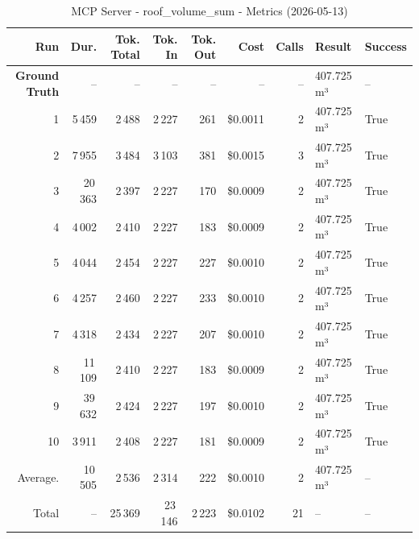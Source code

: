 \documentclass[a4paper,11pt]{article}
\begin{document}
\begin{table}[ht]
\centering
\scriptsize
\caption{MCP Server - roof\_volume\_sum - Metrics (2026-05-13)}
\label{tab:mcp\_roof\_volume\_sum\_metrics\_2026-05-13}
\begin{tabular}{r r r r r r r p{3cm} l}
\hline
Run & Dur. & Tok. Total & Tok. In & Tok. Out & Cost & Calls & Result & Success \\
\hline
\textbf{Ground Truth} & -- & -- & -- & -- & -- & -- & 407.725 m³ & -- \\
\hline
1 & 5\,459 & 2\,488 & 2\,227 & 261 & \$0.0011 & 2 & 407.725 m³ & True \\
2 & 7\,955 & 3\,484 & 3\,103 & 381 & \$0.0015 & 3 & 407.725 m³ & True \\
3 & 20\,363 & 2\,397 & 2\,227 & 170 & \$0.0009 & 2 & 407.725 m³ & True \\
4 & 4\,002 & 2\,410 & 2\,227 & 183 & \$0.0009 & 2 & 407.725 m³ & True \\
5 & 4\,044 & 2\,454 & 2\,227 & 227 & \$0.0010 & 2 & 407.725 m³ & True \\
6 & 4\,257 & 2\,460 & 2\,227 & 233 & \$0.0010 & 2 & 407.725 m³ & True \\
7 & 4\,318 & 2\,434 & 2\,227 & 207 & \$0.0010 & 2 & 407.725 m³ & True \\
8 & 11\,109 & 2\,410 & 2\,227 & 183 & \$0.0009 & 2 & 407.725 m³ & True \\
9 & 39\,632 & 2\,424 & 2\,227 & 197 & \$0.0010 & 2 & 407.725 m³ & True \\
10 & 3\,911 & 2\,408 & 2\,227 & 181 & \$0.0009 & 2 & 407.725 m³ & True \\
\hline
Average. & 10\,505 & 2\,536 & 2\,314 & 222 & \$0.0010 & 2 & 407.725 m³ & -- \\
Total & -- & 25\,369 & 23\,146 & 2\,223 & \$0.0102 & 21 & -- & -- \\
\hline
\end{tabular}
\end{table}

\clearpage
\end{document}
